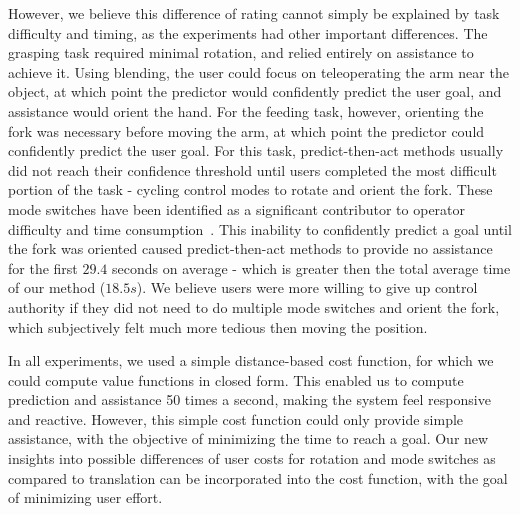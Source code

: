 However, we believe this difference of rating cannot simply be explained by task difficulty and timing, as the experiments had other important differences. %
The grasping task required minimal rotation, and relied entirely on assistance to achieve it. Using blending, the user could focus on teleoperating the arm near the object, at which point the predictor would confidently predict the user goal, and assistance would orient the hand. For the feeding task, however, orienting the fork was necessary before moving the arm, at which point the predictor could confidently predict the user goal. For this task, predict-then-act methods usually did not reach their confidence threshold until users completed the most difficult portion of the task - cycling control modes to rotate and orient the fork. These mode switches have been identified as a significant contributor to operator difficulty and time consumption~\citep{herlant_2016}. This inability to confidently predict a goal until the fork was oriented caused predict-then-act methods to provide no assistance for the first $29.4$ seconds on average - which is greater then the total average time of our method ($18.5s$). We believe users were more willing to give up control authority if they did not need to do multiple mode switches and orient the fork, which subjectively felt much more tedious then moving the position.



In all experiments, we used a simple distance-based cost function, for which we could compute value functions in closed form. This enabled us to compute prediction and assistance 50 times a second, making the system feel responsive and reactive. However, this simple cost function could only provide simple assistance, with the objective of minimizing the time to reach a goal. Our new insights into possible differences of user costs for rotation and mode switches as compared to translation can be incorporated into the cost function, with the goal of minimizing user effort.

